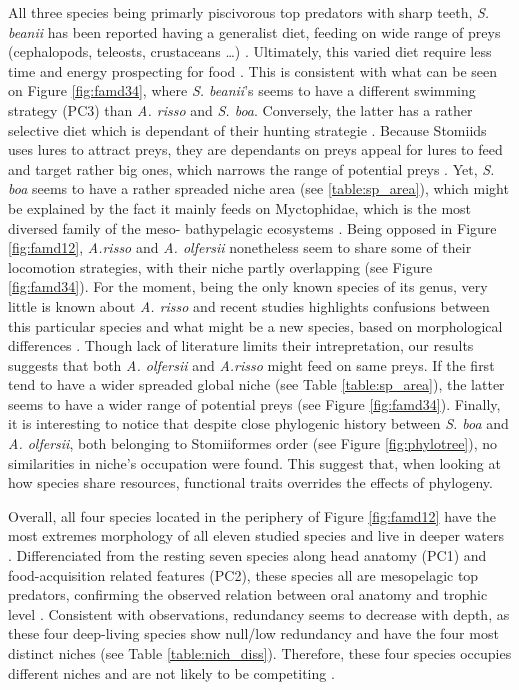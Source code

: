 All three species being primarly piscivorous top predators with sharp teeth, \textit{S. beanii} has been reported having a generalist diet, feeding on wide range of preys (cephalopods, teleosts, crustaceans \ldots{}) \citep{geidner2008}. Ultimately, this varied diet require less time and energy prospecting for food \citep{geidner2008}. This is consistent with what can be seen on Figure \ref{fig:famd34}, where \textit{S. beanii}'s seems to have a different swimming strategy (PC3) than \textit{A. risso} and \textit{S. boa}. Conversely, the latter has a rather selective diet which is dependant of their hunting strategie \citep{sutton1996}. Because Stomiids uses lures to attract preys, they are dependants on preys appeal for lures to feed and target rather big ones, which narrows the range of potential preys \citep{geidner2008,germain2019}. Yet, \textit{S. boa} seems to have a rather spreaded niche area (see \ref{table:sp_area}), which might be explained by the fact it mainly feeds on Myctophidae, which is the most diversed family of the meso- bathypelagic ecosystems \citep{garcia2021,sutton1996}. Being opposed in Figure \ref{fig:famd12}, \textit{A.risso} and \textit{A. olfersii} nonetheless seem to share some of their locomotion strategies, with their niche partly overlapping (see Figure \ref{fig:famd34}). For the moment, being the only known species of its genus, very little is known about \textit{A. risso} and recent studies highlights confusions between this particular species and what might be a new species, based on morphological differences \citep{ho2019}. Though lack of literature limits their intrepretation, our results suggests that both \textit{A. olfersii} and \textit{A.risso} might feed on same preys. If the first tend to have a wider spreaded global niche (see Table \ref{table:sp_area}), the latter seems to have a wider range of potential preys (see Figure \ref{fig:famd34}). Finally, it is interesting to notice that despite close phylogenic history between \textit{S. boa} and \textit{A. olfersii}, both belonging to Stomiiformes order (see Figure \ref{fig:phylotree}), no similarities in niche's occupation were found. This suggest that, when looking at how species share resources, functional traits overrides the effects of phylogeny. 

Overall, all four species located in the periphery of Figure \ref{fig:famd12} have the most extremes morphology of all eleven studied species and live in deeper waters \citep{froese2019}. Differenciated from the resting seven species along head anatomy (PC1) and food-acquisition related features (PC2), these species all are mesopelagic top predators, confirming the observed relation between oral anatomy and trophic level \citep{colborne2013,wainwright1995}. Consistent with \citet{farre2016} observations, redundancy seems to decrease with depth, as these four deep-living species show null/low redundancy and have the four most distinct niches (see Table \ref{table:nich_diss}). Therefore, these four species occupies different niches and are not likely to be competiting \citep{mouillot2005}.

